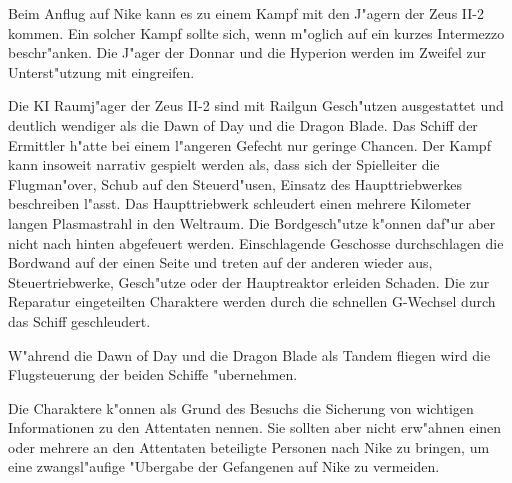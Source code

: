 \begin{remarks}
	Beim Anflug auf Nike kann es zu einem Kampf mit den J"agern der Zeus II-2 kommen. Ein solcher Kampf sollte sich, wenn m"oglich auf ein kurzes Intermezzo beschr"anken. Die J"ager der Donnar und die Hyperion werden im Zweifel zur Unterst"utzung mit eingreifen. 
	
	Die KI Raumj"ager der Zeus II-2 sind mit Railgun Gesch"utzen ausgestattet und deutlich wendiger als die Dawn of Day und die Dragon Blade. Das Schiff der Ermittler h"atte bei einem l"angeren Gefecht nur geringe Chancen. Der Kampf kann insoweit narrativ gespielt werden als, dass sich der Spielleiter die Flugman"over, Schub auf den Steuerd"usen, Einsatz des Haupttriebwerkes beschreiben l"asst. Das Haupttriebwerk schleudert einen mehrere Kilometer langen Plasmastrahl in den Weltraum. Die Bordgesch"utze k"onnen daf"ur aber nicht nach hinten abgefeuert werden. Einschlagende Geschosse durchschlagen die Bordwand auf der einen Seite und treten auf der anderen wieder aus, Steuertriebwerke, Gesch"utze oder der Hauptreaktor erleiden Schaden. Die zur Reparatur eingeteilten Charaktere werden durch die schnellen G-Wechsel durch das Schiff geschleudert.

	W"ahrend die Dawn of Day und die Dragon Blade als Tandem fliegen wird \xl{} die Flugsteuerung der beiden Schiffe "ubernehmen.

	Die Charaktere k"onnen als Grund des Besuchs die Sicherung von wichtigen Informationen zu den Attentaten nennen. Sie sollten aber nicht erw"ahnen einen oder mehrere an den Attentaten beteiligte Personen nach Nike zu bringen, um eine zwangsl"aufige "Ubergabe der Gefangenen auf Nike zu vermeiden.
\end{remarks}
\newpage
